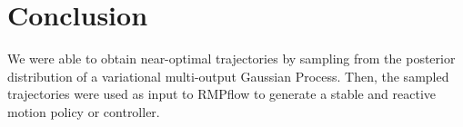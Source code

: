\section{Conclusion}
We were able to obtain near-optimal trajectories by sampling from the posterior distribution of a variational multi-output Gaussian Process. Then, the sampled trajectories were used as input to RMPflow to generate a stable and reactive motion policy or controller. 